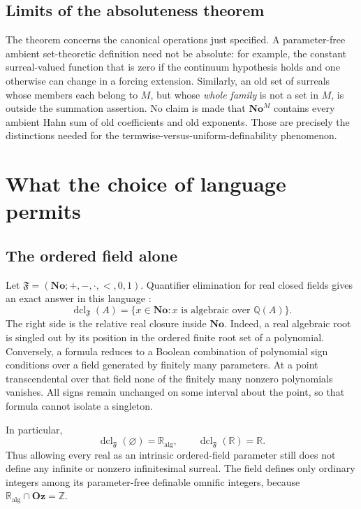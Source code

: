 \documentclass[11pt,a4paper]{article}
\numberwithin{equation}{section}
\theoremstyle{definition}
\theoremstyle{remark}
\newcommand{\No}{\mathbf{No}}
\newcommand{\Oz}{\mathbf{Oz}}
\newcommand{\Z}{\mathbb Z}
\newcommand{\Q}{\mathbb Q}
\newcommand{\R}{\mathbb R}
\newcommand{\dcl}{\operatorname{dcl}}
\begin{document}
\subsection{Limits of the absoluteness theorem}

The theorem concerns the canonical operations just specified.  A
parameter-free ambient set-theoretic definition need not be absolute:
for example, the constant surreal-valued function that is zero if
the continuum hypothesis holds and one otherwise can change in a
forcing extension.  Similarly, an old set of surreals whose members
each belong to $M$, but whose \emph{whole family} is not a set in
$M$, is outside the summation assertion.  No claim is made that
$\No^M$ contains every ambient Hahn sum of old coefficients
and old exponents.  Those are precisely the distinctions needed for
the termwise-versus-uniform-definability phenomenon.


\section{What the choice of language permits}
\label{dsn:op:sec:languages}

\subsection{The ordered field alone}

Let \(\mathfrak F=(\No;+,-,\cdot,<,0,1)\).  Quantifier elimination for
real closed fields gives an exact answer in this language
\cite{Marker}:
\begin{equation}\label{dsn:op:eq:pure-dcl}
 \dcl_{\mathfrak F}(A)
 =\{x\in\No:x\text{ is algebraic over }\Q(A)\}.
\end{equation}
The right side is the relative real closure inside \(\No\).
Indeed, a real algebraic root is singled out by its position in the
ordered finite root set of a polynomial.  Conversely, a formula reduces
to a Boolean combination of polynomial sign conditions over a field
generated by finitely many parameters.  At a point transcendental over
that field none of the finitely many nonzero polynomials vanishes.
All signs remain unchanged on some interval about the point, so that
formula cannot isolate a singleton.

In particular,
\[
 \dcl_{\mathfrak F}(\varnothing)=\R_{\mathrm{alg}},\qquad
 \dcl_{\mathfrak F}(\R)=\R.
\]
Thus allowing every real as an intrinsic ordered-field parameter still
does not define any infinite or nonzero infinitesimal surreal.
The field defines only ordinary integers among its parameter-free
definable omnific integers, because
\(\R_{\mathrm{alg}}\cap\Oz=\Z\).
\end{document}
